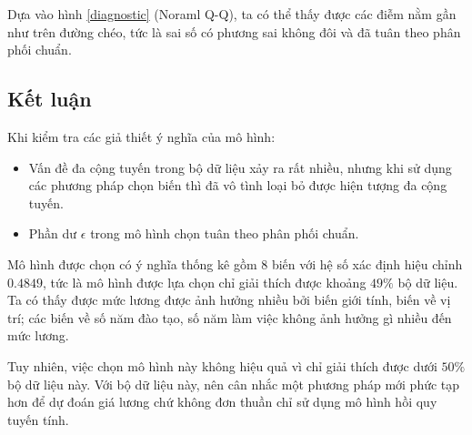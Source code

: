 Dựa vào hình \ref{diagnostic} (Noraml Q-Q), ta có thể thấy được các điễm nằm gần như trên đường chéo, tức là sai số có phương sai không đôi và đã tuân theo phân phối chuẩn.

\subsection*{Kết luận}
Khi kiểm tra các giả thiết ý nghĩa của mô hình:
\begin{itemize}
	\item Vấn đề đa cộng tuyến trong bộ dữ liệu xảy ra rất nhiều, nhưng khi sử dụng các phương pháp chọn biến thì đã vô tình loại bỏ được hiện tượng đa cộng tuyến.
	\item Phần dư $\epsilon$ trong mô hình chọn tuân theo phân phối chuẩn.
\end{itemize}
Mô hình được chọn có ý nghĩa thống kê gồm 8 biến với hệ số xác định hiệu chỉnh $0.4849$, tức là mô hình được lựa chọn chỉ giải thích được khoảng $49\%$ bộ dữ liệu. Ta có thấy được mức lương được ảnh hưởng nhiều bởi biến giới tính, biến về vị trí; các biến về số năm đào tạo, số năm làm việc không ảnh hưởng gì nhiều đến mức lương.

Tuy nhiên, việc chọn mô hình này không hiệu quả vì chỉ giải thích được dưới $50\%$ bộ dữ liệu này. Với bộ dữ liệu này, nên cân nhắc một phương pháp mới phức tạp hơn để dự đoán giá lương chứ không đơn thuần chỉ sử dụng mô hình hồi quy tuyến tính.
